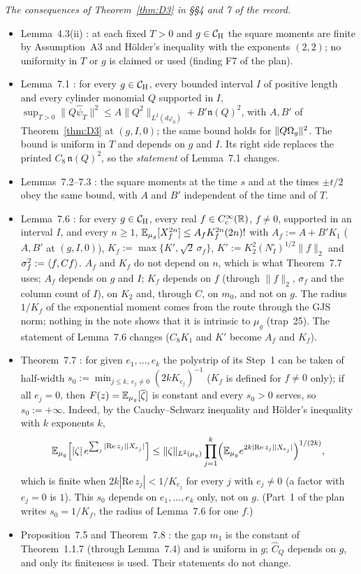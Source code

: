 \emph{The consequences of Theorem~\ref{thm:D3} in \S\S4 and 7 of the record.}
\begin{itemize}
\item Lemma~4.3(ii) \cite[p.~17]{R}: at each fixed $T>0$ and $g\in\mathcal{C}_{\mathrm H}$ the square moments
are finite by Assumption~A3 and H\"older's inequality with the exponents $(2,2)$; no
uniformity in $T$ or $g$ is claimed or used (finding F7 of the plan).
\item Lemma~7.1 \cite[p.~20]{R}: for every $g\in\mathcal{C}_{\mathrm H}$, every bounded interval $I$ of positive
length and every cylinder monomial $Q$ supported in $I$,
$\sup_{T>0}\|Q\hat\psi_T\|^2\le A\|Q^2\|_{L^2(d\varphi_0)}+B'\mathfrak n(Q)^2$, with $A,B'$ of
Theorem~\ref{thm:D3} at $(g,I,0)$; the same bound holds for $\|Q\Omega_g\|^2$. The bound is
uniform in $T$ and depends on $g$ and $I$. Its right side replaces the printed
$C_8\,\mathfrak n(Q)^2$, so the \emph{statement} of Lemma~7.1 changes.
\item Lemmas~7.2--7.3 \cite[pp.~20--21]{R}: the square moments at the time $s$ and at the
times $\pm t/2$ obey the same bound, with $A$ and $B'$ independent of the time and of $T$.
\item Lemma~7.6 \cite[p.~22]{R}: for every $g\in\mathcal{C}_{\mathrm H}$, every real $f\in C_c^\infty(\mathbb{R})$,
$f\ne0$, supported in an interval $I$, and every $n\ge1$,
$\mathbb{E}_{\mu_g}[X_f^{2n}]\le A_fK_f^{2n}(2n)!$ with $A_f:=A+B'K_1$ ($A,B'$ at $(g,I,0)$),
$K_f:=\max\{K',\sqrt2\,\sigma_f\}$, $K':=K_2^2(N^\square_I)^{1/2}\|f\|_2$ and
$\sigma_f^2:=\langle f,Cf\rangle$. $A_f$ and $K_f$ do not depend on $n$, which is what Theorem~7.7 uses;
$A_f$ depends on $g$ and $I$; $K_f$ depends on $f$ (through $\|f\|_2$, $\sigma_f$ and the column
count of $I$), on $K_2$ and, through $C$, on $m_0$, and not on $g$. The radius $1/K_f$ of the
exponential moment comes from the route through the GJS norm; nothing in the note shows that it
is intrinsic to $\mu_g$ (trap~25). The statement of Lemma~7.6 changes ($C_8K_1$ and $K'$
become $A_f$ and $K_f$).
\item Theorem~7.7 \cite[p.~23]{R}: for given $e_1,\dots,e_k$ the polystrip of its Step~1 can
be taken of half-width $s_0:=\min_{j\le k,\ e_j\ne0}(2kK_{e_j})^{-1}$ ($K_f$ is defined for
$f\ne0$ only); if all $e_j=0$, then $F(z)=\mathbb{E}_{\mu_g}[\overline\zeta]$ is constant and every
$s_0>0$ serves, so $s_0:=+\infty$.  Indeed, by the Cauchy--Schwarz inequality and H\"older's
inequality with $k$ exponents $k$,
\[
 \mathbb{E}_{\mu_g}\Bigl[|\zeta|\,e^{\sum_j|\mathrm{Re}\,z_j||X_{e_j}|}\Bigr]
 \le\|\zeta\|_{L^2(\mu_g)}\prod_{j=1}^k
 \Bigl(\mathbb{E}_{\mu_g}e^{2k|\mathrm{Re}\,z_j||X_{e_j}|}\Bigr)^{1/(2k)},
\]
which is finite when $2k|\mathrm{Re}\,z_j|<1/K_{e_j}$ for every $j$ with $e_j\ne0$ (a factor
with $e_j=0$ is $1$). This $s_0$ depends on $e_1,\dots,e_k$ only, not on $g$. (Part~1 of the plan writes $s_0=1/K_f$, the radius of Lemma~7.6 for one $f$.)
\item Proposition~7.5 and Theorem~7.8 \cite[pp.~22--23]{R}: the gap $m_1$ is the constant of
Theorem~1.1.7 (through Lemma~7.4) and is uniform in $g$; $\widehat C_Q$ depends on $g$, and
only its finiteness is used. Their statements do not change.
\end{itemize}

